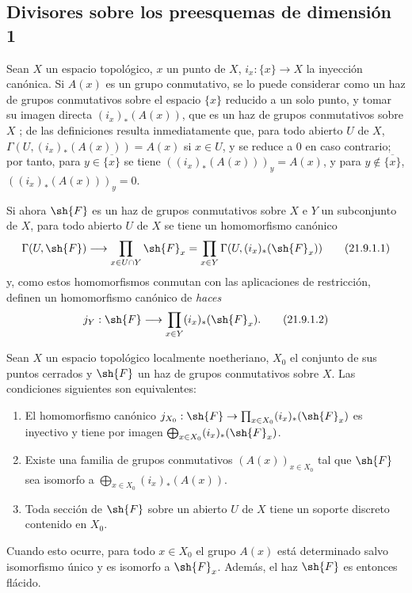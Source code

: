 \subsection{Divisores sobre los preesquemas de dimensión 1}
\label{subsection:IV.21.9}
\label{IV.21.9}

\begin{env}[21.9.1]
\label{IV.21.9.1}
Sean $X$ un espacio topológico, $x$ un punto de $X$, $i_x:\{x\}\to X$ la inyección canónica.
Si $A(x)$ es un grupo conmutativo, se lo puede considerar como un haz de grupos conmutativos sobre el espacio $\{x\}$ reducido a un solo punto, y tomar su imagen directa $(i_x)_*(A(x))$, que es un haz de grupos conmutativos sobre $X$ ;
de las definiciones resulta inmediatamente que, para todo abierto $U$ de $X$, $\Gamma(U,(i_x)_*(A(x)))=A(x)$ si $x\in U$, y se reduce a $0$ en caso contrario;
por tanto, para $y\in\overline{\{x\}}$ se tiene $((i_x)_*(A(x)))_y=A(x)$, y para $y\notin\overline{\{x\}}$, $((i_x)_*(A(x)))_y=0$.

Si ahora $\sh{F}$ es un haz de grupos conmutativos sobre $X$ e $Y$ un subconjunto de $X$, para todo abierto $U$ de $X$ se tiene un homomorfismo canónico
\[
\label{IV.21.9.1.1}
  \Gamma(U,\sh{F})\to\prod_{x\in U\cap Y}\sh{F}_x
  =\prod_{x\in Y}\Gamma(U,(i_x)_*(\sh{F}_x))
  \tag{21.9.1.1}
\]
y, como estos homomorfismos conmutan con las aplicaciones de restricción, definen un homomorfismo canónico de \emph{haces}
\[
\label{IV.21.9.1.2}
  j_Y:\sh{F}\to\prod_{x\in Y}(i_x)_*(\sh{F}_x).
  \tag{21.9.1.2}
\]
\end{env}

\begin{lemma}[21.9.2]
\label{IV.21.9.2}
Sean $X$ un espacio topológico localmente noetheriano, $X_0$ el conjunto de sus puntos cerrados y $\sh{F}$ un haz de grupos conmutativos sobre $X$.
Las condiciones siguientes son equivalentes:
\begin{enumerate}[label=\emph{\alph*)}]
  \item El homomorfismo canónico $j_{X_0}:\sh{F}\to\prod_{x\in X_0}(i_x)_*(\sh{F}_x)$ es inyectivo y tiene por imagen $\bigoplus_{x\in X_0}(i_x)_*(\sh{F}_x)$.
  \item[\rm a$'$)] Existe una familia de grupos conmutativos $(A(x))_{x\in X_0}$ tal que $\sh{F}$ sea isomorfo a $\bigoplus_{x\in X_0}(i_x)_*(A(x))$.
  \item Toda sección de $\sh{F}$ sobre un abierto $U$ de $X$ tiene un soporte discreto contenido en $X_0$.
\end{enumerate}
Cuando esto ocurre, para todo $x\in X_0$ el grupo $A(x)$ está determinado salvo isomorfismo único y es isomorfo a $\sh{F}_x$.
Además, el haz $\sh{F}$ es entonces flácido.
\end{lemma}

